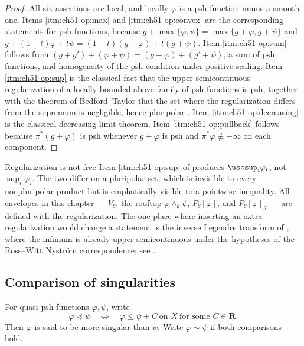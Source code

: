 \begin{proof}
All six assertions are local, and locally \(\varphi\) is a psh function
minus a smooth one.  Items \cref{itm:ch51-op:max} and
\cref{itm:ch51-op:convex} are the corresponding statements for psh
functions, because \(g+\max\{\varphi,\psi\}=\max\{g+\varphi,g+\psi\}\) and
\(g+(1-t)\varphi+t\psi=(1-t)(g+\varphi)+t(g+\psi)\).
Item \cref{itm:ch51-op:sum} follows from
\((g+g')+(\varphi+\psi)=(g+\varphi)+(g'+\psi)\), a sum of psh functions,
and homogeneity of the psh condition under positive scaling.
Item \cref{itm:ch51-op:sup} is the classical fact that the upper
semicontinuous regularization of a locally bounded-above family of psh
functions is psh, together with the theorem of Bedford--Taylor that the
set where the regularization differs from the supremum is negligible,
hence pluripolar \cite[Theorem~7.1]{BT82}.
Item \cref{itm:ch51-op:decreasing} is the classical decreasing-limit
theorem.  Item \cref{itm:ch51-op:pullback} follows because
\(\pi^*(g+\varphi)\) is psh whenever \(g+\varphi\) is psh and
\(\pi^*\varphi\not\equiv-\infty\) on each component.
\end{proof}

\begin{warning}{Regularization is not free}
\label{warn:ch51-usc}
Item \cref{itm:ch51-op:sup} of  produces \(\uscsup_i\varphi_i\), not
\(\sup_i\varphi_i\).  The two differ on a pluripolar set, which is
invisible to every nonpluripolar product but is emphatically visible to a
pointwise inequality.  All envelopes in this chapter --- \(V_\theta\), the
rooftop \(\varphi\wedge_\theta\psi\), \(P_\theta[\varphi]\), and
\(P_\theta[\varphi]_{\mathcal I}\) --- are defined with the
regularization.  The one place where inserting an extra regularization
would change a statement is the inverse Legendre transform of
, where the infimum is already upper
semicontinuous under the hypotheses of the Ross--Witt Nystr\"om
correspondence; see .
\end{warning}

\subsection{Comparison of singularities}
\label{sec:ch51-ordinary-order}

\begin{definition}
\label{def:complex-singularity-order}
For quasi-psh functions \(\varphi,\psi\), write
\[
 \varphi\preceq\psi
 \quad\Longleftrightarrow\quad
 \varphi\leq\psi+C\ \text{on }X\ \text{for some }C\in\mathbf R.
\tag{51.4}\label{eq:complex-singularity-order}
\]
Then \(\varphi\) is said to be more singular than \(\psi\).
Write \(\varphi\sim\psi\) if both comparisons hold.
\end{definition}

